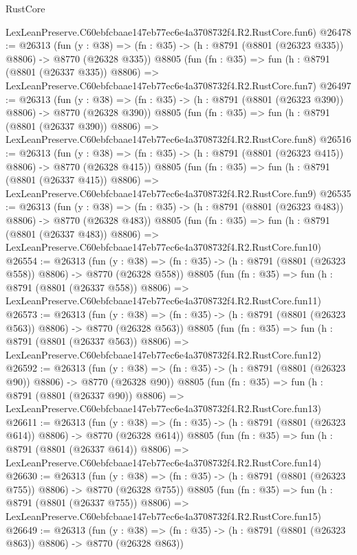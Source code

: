 \begin{lexlean}{RustCore}
\begin{coremodule}
    LexLeanPreserve.C60ebfcbaae147eb77ec6e4a3708732f4.R2.RustCore.fun6)
@26478 := @26313
    (fun (y : @38) => (fn : @35) -> (h : @8791 (@8801 (@26323 @335)) @8806) -> @8770 (@26328 @335))
    @8805
    (fun (fn : @35) =>
    fun (h : @8791 (@8801 (@26337 @335)) @8806) =>
    LexLeanPreserve.C60ebfcbaae147eb77ec6e4a3708732f4.R2.RustCore.fun7)
@26497 := @26313
    (fun (y : @38) => (fn : @35) -> (h : @8791 (@8801 (@26323 @390)) @8806) -> @8770 (@26328 @390))
    @8805
    (fun (fn : @35) =>
    fun (h : @8791 (@8801 (@26337 @390)) @8806) =>
    LexLeanPreserve.C60ebfcbaae147eb77ec6e4a3708732f4.R2.RustCore.fun8)
@26516 := @26313
    (fun (y : @38) => (fn : @35) -> (h : @8791 (@8801 (@26323 @415)) @8806) -> @8770 (@26328 @415))
    @8805
    (fun (fn : @35) =>
    fun (h : @8791 (@8801 (@26337 @415)) @8806) =>
    LexLeanPreserve.C60ebfcbaae147eb77ec6e4a3708732f4.R2.RustCore.fun9)
@26535 := @26313
    (fun (y : @38) => (fn : @35) -> (h : @8791 (@8801 (@26323 @483)) @8806) -> @8770 (@26328 @483))
    @8805
    (fun (fn : @35) =>
    fun (h : @8791 (@8801 (@26337 @483)) @8806) =>
    LexLeanPreserve.C60ebfcbaae147eb77ec6e4a3708732f4.R2.RustCore.fun10)
@26554 := @26313
    (fun (y : @38) => (fn : @35) -> (h : @8791 (@8801 (@26323 @558)) @8806) -> @8770 (@26328 @558))
    @8805
    (fun (fn : @35) =>
    fun (h : @8791 (@8801 (@26337 @558)) @8806) =>
    LexLeanPreserve.C60ebfcbaae147eb77ec6e4a3708732f4.R2.RustCore.fun11)
@26573 := @26313
    (fun (y : @38) => (fn : @35) -> (h : @8791 (@8801 (@26323 @563)) @8806) -> @8770 (@26328 @563))
    @8805
    (fun (fn : @35) =>
    fun (h : @8791 (@8801 (@26337 @563)) @8806) =>
    LexLeanPreserve.C60ebfcbaae147eb77ec6e4a3708732f4.R2.RustCore.fun12)
@26592 := @26313
    (fun (y : @38) => (fn : @35) -> (h : @8791 (@8801 (@26323 @90)) @8806) -> @8770 (@26328 @90))
    @8805
    (fun (fn : @35) =>
    fun (h : @8791 (@8801 (@26337 @90)) @8806) =>
    LexLeanPreserve.C60ebfcbaae147eb77ec6e4a3708732f4.R2.RustCore.fun13)
@26611 := @26313
    (fun (y : @38) => (fn : @35) -> (h : @8791 (@8801 (@26323 @614)) @8806) -> @8770 (@26328 @614))
    @8805
    (fun (fn : @35) =>
    fun (h : @8791 (@8801 (@26337 @614)) @8806) =>
    LexLeanPreserve.C60ebfcbaae147eb77ec6e4a3708732f4.R2.RustCore.fun14)
@26630 := @26313
    (fun (y : @38) => (fn : @35) -> (h : @8791 (@8801 (@26323 @755)) @8806) -> @8770 (@26328 @755))
    @8805
    (fun (fn : @35) =>
    fun (h : @8791 (@8801 (@26337 @755)) @8806) =>
    LexLeanPreserve.C60ebfcbaae147eb77ec6e4a3708732f4.R2.RustCore.fun15)
@26649 := @26313
    (fun (y : @38) => (fn : @35) -> (h : @8791 (@8801 (@26323 @863)) @8806) -> @8770 (@26328 @863))

\end{coremodule}
\end{lexlean}
